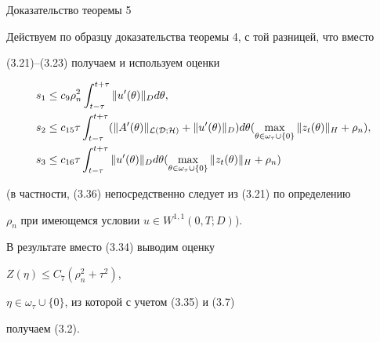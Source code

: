 \begin{pf*}{Доказательство теоремы 5}


Действуем по образцу доказательства теоремы 4, с той разницей, что вместо


(3.21)--(3.23) получаем и используем оценки


\begin{align}


s_1&\le c_9\rho_n^2\int_{t-\tau}^{t+\tau}\|u'(\theta)\|_Dd\theta, \\


s_2&\le c_{15}\tau\int_{t-\tau}^{t+\tau}(\|A'(\theta)\|_{\cal L(D;H)}+


\|u'(\theta)\|_D)d\theta(\max\limits_


{\theta\in\omega_{\tau}\cup\{0\}}\|z_t(\theta)\|_H+\rho_n),\notag\\


s_3&\le c_{16}\tau\int_{t-\tau}^{t+\tau}\|u'(\theta)\|_Dd\theta


(\max\limits_{\theta\in\omega_{\tau}\cup\{0\}}\|z_t(\theta)\|_H+


\rho_n)\notag


\end{align}


(в частности, (3.36) непосредственно следует из (3.21) по определению


$\rho_n$  при имеющемся условии $u\in W^{1,1}(0,T;D)$).


В результате вместо (3.34) выводим оценку


$Z(\eta)\le C_7(\rho_n^2+\tau^2)$,


$\eta\in\omega_{\tau}\cup\{0\}$, из которой с учетом (3.35) и (3.7)


получаем (3.2).


\end{pf*}






